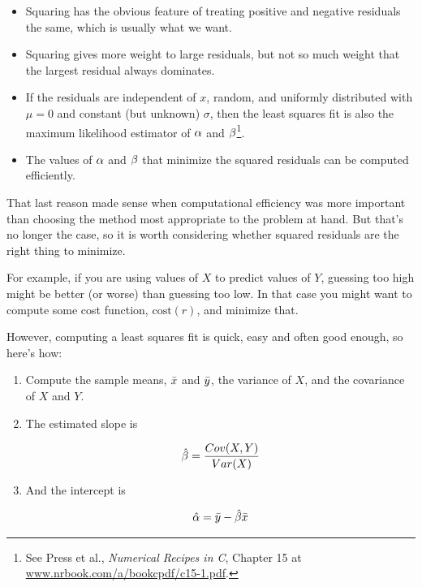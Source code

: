 \documentclass[12pt]{book}
\begin{document}
\begin{itemize}

\item Squaring has the obvious feature of treating positive and
negative residuals the same, which is usually what we want.

\item Squaring gives more weight to large residuals, but not
so much weight that the largest residual always dominates.

\item If the residuals are independent of $x$, random, and uniformly
  distributed with $\mu=0$ and constant (but unknown) $\sigma$, then
  the least squares fit is also the maximum likelihood estimator of
  $\alpha$ and $\beta$\footnote{See Press et al., {\em Numerical Recipes in C},
    Chapter 15 at \url{www.nrbook.com/a/bookcpdf/c15-1.pdf}.}.

\item The values of $\alpha$ and $\beta$ that minimize the squared
  residuals can be computed efficiently.

\end{itemize}

That last reason made sense when computational efficiency was more
important than choosing the method most appropriate to the problem
at hand.  But that's no longer the case, so it is worth considering
whether squared residuals are the right thing to minimize.

For example, if you are using values of $X$ to predict values of $Y$,
guessing too high might be better (or worse) than
guessing too low.  In that case you might want to compute some
cost function, $\mathrm{cost}(r)$, and minimize that.

However, computing a least squares fit is quick, easy and often good
enough, so here's how:

\begin{enumerate}

\item Compute the sample means, $\bar{x}$ and $\bar{y}$, the variance
of $X$, and the covariance of $X$ and $Y$.

\item The estimated slope is

\[ \hat{\beta} = \frac{Cov(X,Y)}{Var(X)} \]

\item And the intercept is

\[ \hat{\alpha} = \bar{y} - \hat{\beta} \bar{x}\]

\end{enumerate}
\end{document}
